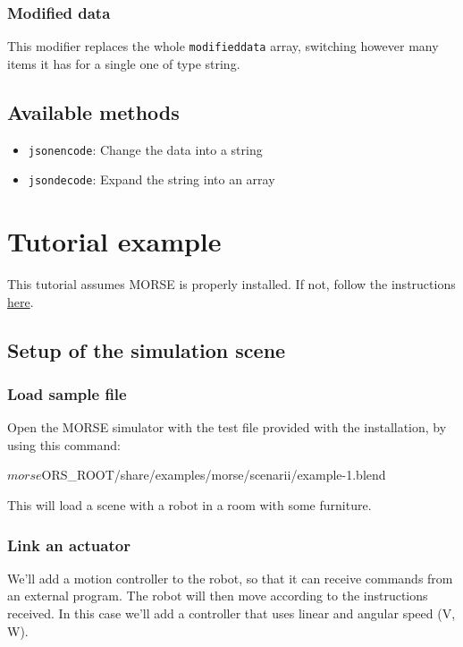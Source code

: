 \documentclass[twoside,a4paper,10pt]{report}
\newcommand{\dokutitlelevelone}[1]{\chapter{#1}}
\newcommand{\dokutitleleveltwo}[1]{\section{#1}}
\newcommand{\dokutitleleveltree}[1]{\subsection{#1}}
\newcommand{\dokumonospace}[1]{\texttt{#1}}
\newcommand{\dokuitem}{\item}
\begin{document}
\dokutitleleveltree{Modified data}
\label{c1a1a093b7ca2545d0d88cac0ff8ccf6}%
This modifier replaces the whole \dokumonospace{modified{\textunderscore}data} array, switching however many items it has for a single one of type string.


\dokutitleleveltwo{Available methods}
\label{a2d06dcb42bbd0519b19166fd7f36cea}%

\begin{itemize}
\dokuitem  \dokumonospace{json{\textunderscore}encode}: Change the data into a string
\dokuitem  \dokumonospace{json{\textunderscore}decode}: Expand the string into an array
\end{itemize}

\dokutitlelevelone{Tutorial example}
\label{d0e1bed8b40ec8e4f9cc0cc0a11ff110}%
\label{0575c8d592fb7b088226750aceec2b4e}%

This tutorial assumes MORSE is properly installed. If not, follow the instructions \hyperref[ea09bb364ef1bffd889e76b7a59035fc]{ here}.


\dokutitleleveltwo{Setup of the simulation scene}
\label{80527725485ea9e7bedbc9d918895a02}%

\dokutitleleveltree{Load sample file}
\label{4238ab1e3d8f80f2fdec7f34e17e0f67}%

Open the MORSE simulator with the test file provided with the installation, by using this command:



\small
\begin{verbatimtab}
$ morse $ORS_ROOT/share/examples/morse/scenarii/example-1.blend
\end{verbatimtab}
\normalsize

This will load a scene with a robot in a room with some furniture.


\dokutitleleveltree{Link an actuator}
\label{81c6b973417d3e5000d27d9c1c805b96}%

We'll add a motion controller to the robot, so that it can receive commands from an external program. The robot will then move according to the instructions received. In this case we'll add a controller that uses linear and angular speed (V, W).
\end{document}
